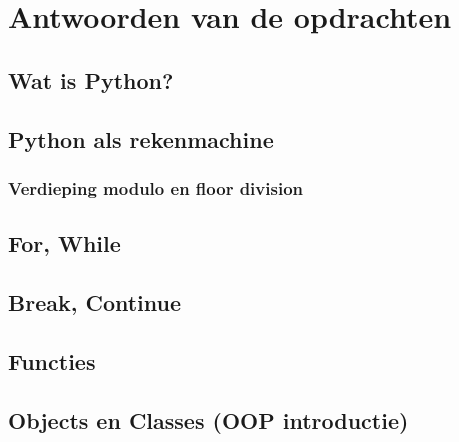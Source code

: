 \documentclass[a4paper,12pt,twoside,openright,titlepage]{book}
\begin{document}
\chapter{Antwoorden van de opdrachten}
\section{Wat is Python?}

\section{Python als rekenmachine}

\subsection{Verdieping modulo en floor division}

\section{For, While}

\section{Break, Continue}

\section{Functies}

\section{Objects en Classes (OOP introductie)}



\printindex
\end{document}
